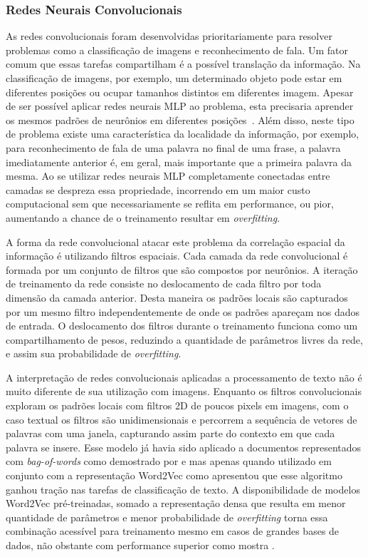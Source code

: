 
\subsubsection{Redes Neurais Convolucionais}

As redes convolucionais foram desenvolvidas prioritariamente para resolver
problemas como a classificação de imagens e reconhecimento de fala.
Um fator comum que essas tarefas compartilham é a possível translação da
informação.
Na classificação de imagens, por exemplo, um determinado objeto pode estar em
diferentes posições ou ocupar tamanhos distintos em diferentes imagem.
Apesar de ser possível aplicar redes neurais MLP ao problema, esta precisaria
aprender os mesmos padrões de neurônios em diferentes posições~\cite{lecun95}.
Além disso, neste tipo de problema existe uma característica da localidade da
informação, por exemplo, para reconhecimento de fala de uma palavra no final de
uma frase, a palavra imediatamente anterior é, em geral, mais importante que a
primeira palavra da mesma.
Ao se utilizar redes neurais MLP completamente conectadas entre camadas se
despreza essa propriedade, incorrendo em um maior custo computacional sem que
necessariamente se reflita em performance, ou pior, aumentando a chance de o
treinamento resultar em \textit{overfitting}.

A forma da rede convolucional atacar este problema da correlação espacial da
informação é utilizando filtros espaciais.
Cada camada da rede convolucional é formada por um conjunto de filtros que são
compostos por neurônios.
A iteração de treinamento da rede consiste no deslocamento de cada filtro por
toda dimensão da camada anterior.
Desta maneira os padrões locais são capturados por um mesmo filtro
independentemente de onde os padrões apareçam nos dados de entrada.
O deslocamento dos filtros durante o treinamento funciona como um
compartilhamento de pesos, reduzindo a quantidade de parâmetros livres da rede,
e assim sua probabilidade de \textit{overfitting}.

A interpretação de redes convolucionais aplicadas a processamento de texto não é
muito diferente de sua utilização com imagens.
Enquanto os filtros convolucionais exploram os padrões locais com filtros 2D de
poucos pixels em imagens, com o caso textual os filtros são unidimensionais e
percorrem a sequência de vetores de palavras com uma janela, capturando assim
parte do contexto em que cada palavra se insere.
Esse modelo já havia sido aplicado a documentos representados com
\textit{bag-of-words} como demostrado por \citet{kalchbrenner14} e
\citet{yih14} mas apenas quando utilizado em conjunto com a representação
Word2Vec como apresentou \citet{kim14} que esse algoritmo ganhou tração nas
tarefas de classificação de texto.
A disponibilidade de modelos Word2Vec pré-treinadas, somado a representação
densa que resulta em menor quantidade de parâmetros e menor probabilidade de
\textit{overfitting} torna essa combinação acessível para treinamento mesmo em
casos de grandes bases de dados, não obstante com performance superior como
mostra \citet{kim14}.

